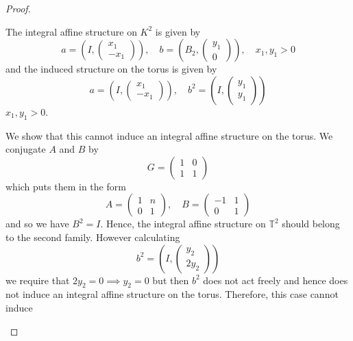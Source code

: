 \begin{proof}
\begin{case}[$A=I$, $B=B_2$]
        The integral affine structure on $K^2$ is given by $$a = \left(I, \begin{pmatrix}
                    x_1 \\ -x_1
                \end{pmatrix}\right), \quad b = \left(B_2, \begin{pmatrix}
                    y_1 \\ 0
                \end{pmatrix}\right), \quad x_1, y_1>0$$
        and the induced structure on the torus is given by
        $$
            a = \left(I , \begin{pmatrix}
                    x_1 \\ -x_1
                \end{pmatrix}\right), \quad b^2 =\left(I , \begin{pmatrix}
                    y_1 \\ y_1
                \end{pmatrix}\right)
        $$
        $x_1, y_1 > 0$.
    \end{case}
    \begin{case}[$A=A_3$, $B=B_2$]
        We show that this cannot induce an integral affine structure on the torus. We conjugate $A$ and $B$ by
        $$
            G = \begin{pmatrix}
                1 & 0 \\
                1 & 1
            \end{pmatrix}
        $$
        which puts them in the form
        $$
            A = \begin{pmatrix}
                1 & n \\
                0 & 1
            \end{pmatrix}, \quad B = \begin{pmatrix}
                -1 & 1 \\
                0  & 1
            \end{pmatrix}
        $$
        and so we have $B^2 = I$. Hence, the integral affine structure on $\mathbb{T}^2$ should belong to the second family. However calculating
        $$
            b^2 = \left(I, \begin{pmatrix}
                    y_2 \\ 2y_2
                \end{pmatrix}\right)
        $$
        we require that $2y_2 = 0 \implies y_2 = 0$ but then $b^2$ does not act freely and hence does not induce an integral affine structure on the torus. Therefore, this case cannot induce

\end{case}
\end{proof}
